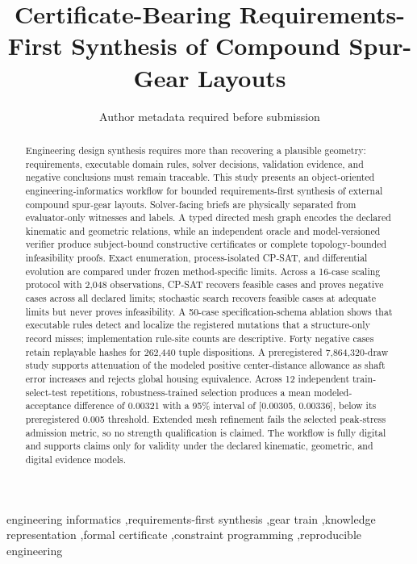 \documentclass[preprint,12pt]{elsarticle}
\begin{document}
\begin{frontmatter}
\title{Certificate-Bearing Requirements-First Synthesis of Compound Spur-Gear Layouts}
\author{Author metadata required before submission}
\begin{abstract}
Engineering design synthesis requires more than recovering a plausible geometry: requirements, executable domain rules, solver decisions, validation evidence, and negative conclusions must remain traceable. This study presents an object-oriented engineering-informatics workflow for bounded requirements-first synthesis of external compound spur-gear layouts. Solver-facing briefs are physically separated from evaluator-only witnesses and labels. A typed directed mesh graph encodes the declared kinematic and geometric relations, while an independent oracle and model-versioned verifier produce subject-bound constructive certificates or complete topology-bounded infeasibility proofs. Exact enumeration, process-isolated CP-SAT, and differential evolution are compared under frozen method-specific limits. Across a 16-case scaling protocol with 2,048 observations, CP-SAT recovers feasible cases and proves negative cases across all declared limits; stochastic search recovers feasible cases at adequate limits but never proves infeasibility. A 50-case specification-schema ablation shows that executable rules detect and localize the registered mutations that a structure-only record misses; implementation rule-site counts are descriptive. Forty negative cases retain replayable hashes for 262,440 tuple dispositions. A preregistered 7,864,320-draw study supports attenuation of the modeled positive center-distance allowance as shaft error increases and rejects global housing equivalence. Across 12 independent train-select-test repetitions, robustness-trained selection produces a mean modeled-acceptance difference of 0.00321 with a 95\% interval of [0.00305, 0.00336], below its preregistered 0.005 threshold. Extended mesh refinement fails the selected peak-stress admission metric, so no strength qualification is claimed. The workflow is fully digital and supports claims only for validity under the declared kinematic, geometric, and digital evidence models.
\end{abstract}
\begin{keyword}
engineering informatics \sep requirements-first synthesis \sep gear train \sep knowledge representation \sep formal certificate \sep constraint programming \sep reproducible engineering
\end{keyword}
\end{frontmatter}
\end{document}
